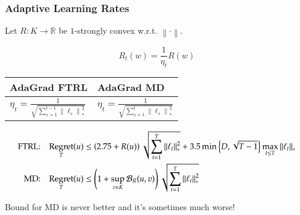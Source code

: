 \documentclass[usenames,dvipsnames]{beamer}
\DeclareMathOperator{\Regret}{Regret}
\newcommand{\R}{\mathbb{R}}
\newcommand{\norm}[1]{\left\|#1\right\|}
\newcommand{\Breg}{\mathcal{B}}
\begin{document}
\begin{frame}
\frametitle{Adaptive Learning Rates}
Let $R:K \to \R$ be $1$-strongly convex w.r.t. $\norm{\cdot}$.

\vspace{0.2cm}

\begin{minipage}{4cm}
$$
R_t(w) = \frac{1}{\eta_t} R(w)
$$
\end{minipage}
%
\begin{minipage}{5cm}
\begin{center}
\def\arraystretch{2}%
\everymath{\displaystyle}
\begin{tabular}{l|l}
AdaGrad FTRL & AdaGrad MD \\ \hline
$\eta_t = \frac{1}{\sqrt{\sum_{s=1}^{t-1} \norm{\ell_s}_*^2}}$ &  $\eta_t = \frac{1}{\sqrt{\sum_{s=1}^t \norm{\ell_s}_*^2}}$ \\
\end{tabular}
\end{center}
\end{minipage}

\pause

\vspace{0.5cm}

\begin{center}
\fontsize{9pt}{10}\selectfont
\begin{align*}
\textsc{FTRL:} & & \Regret_T(u) & \le \left(2.75 + R(u)\right) \sqrt{\sum_{t=1}^T \norm{\ell_t}_*^2} + 3.5 \min \left\{ D, \sqrt{T-1} \right\} \max_{t \le T} \norm{\ell_t}_* \\
\textsc{MD:} & & \Regret_T(u) & \le \left(1 + \sup_{v \in K} \Breg_{R}(u,v) \right) \sqrt{\sum_{t=1}^T \norm{\ell_t}_*^2}
\end{align*}
\end{center}

\vspace{0.5cm}

\pause

Bound for MD is never better and it's sometimes much worse!
\end{frame}
\end{document}
